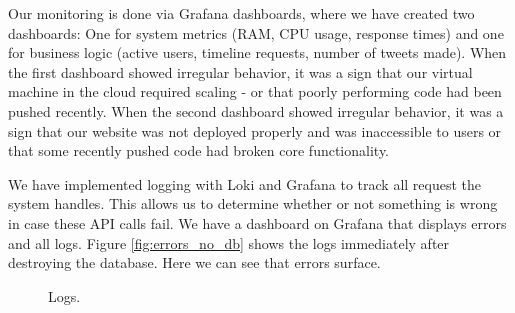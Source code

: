 Our monitoring is done via Grafana dashboards, where we have created two dashboards: One for system metrics (RAM, CPU usage, response times) and one for business logic (active users, timeline requests, number of tweets made). When the first dashboard showed irregular behavior, it was a sign that our virtual machine in the cloud required scaling - or that poorly performing code had been pushed recently. When the second dashboard showed irregular behavior, it was a sign that our website was not deployed properly and was inaccessible to users or that some recently pushed code had broken core functionality.

We have implemented logging with Loki and Grafana to track all request the system handles. This allows us to determine whether or not something is wrong in case these API calls fail. We have a dashboard on Grafana that displays errors and all logs. Figure \ref{fig:errors_no_db} shows the logs immediately after destroying the database. Here we can see that errors surface.


\begin{figure}[H]
    \centering
    \qquad
    \caption{Logs.}%
    \label{fig:example}%
\end{figure}

